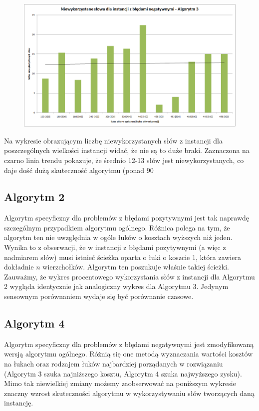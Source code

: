 \documentclass[a4paper,10pt]{article}
\begin{document}
\begin{figure}[h]
  \footnotesize\centering
  \includegraphics[width=\textwidth,keepaspectratio]{unusedWords_general_negative.png}
\end{figure}

Na wykresie obrazującym liczbę niewykorzystanych słów z instancji dla poszczególnych wielkości instancji widać, że nie są to duże braki. Zaznaczona na czarno linia trendu pokazuje, że średnio 12-13 słów jest niewykorzystanych, co daje dość dużą skuteczność algorytmu (ponad 90%

\subsection{Algorytm 2}

Algorytm specyficzny dla problemów z błędami pozytywnymi jest tak naprawdę szczególnym przypadkiem algorytmu ogólnego. Różnica polega na tym, że algorytm ten nie uwzględnia w ogóle łuków o kosztach wyższych niż jeden. Wynika to z obserwacji, że w instancji z błędami pozytywnymi (a więc z nadmiarem słów) musi istnieć ścieżka oparta o łuki o koszcie 1, która zawiera dokładnie $n$ wierzchołków. Algorytm ten poszukuje właśnie takiej ścieżki. Zauważmy, że wykres procentowego wykorzystania słów z instancji dla Algorytmu 2 wygląda identycznie jak analogiczny wykres dla Algorytmu 3. Jedynym sensownym porównaniem wydaje się być porównanie czasowe.

\subsection{Algorytm 4}

Algorytm specyficzny dla problemów z błędami negatywnymi jest zmodyfikowaną wersją algorytmu ogólnego. Różnią się one metodą wyznaczania wartości kosztów na łukach oraz rodzajem łuków najbardziej porządanych w rozwiązaniu (Algorytm 3 szuka najniższego kosztu, Algorytm 4 szuka najwyższego zysku). Mimo tak niewielkiej zmiany możemy zaobserwować na poniższym wykresie znaczny wzrost skuteczności algorytmu w wykorzystywaniu słów tworzących daną instancję.
\end{document}
